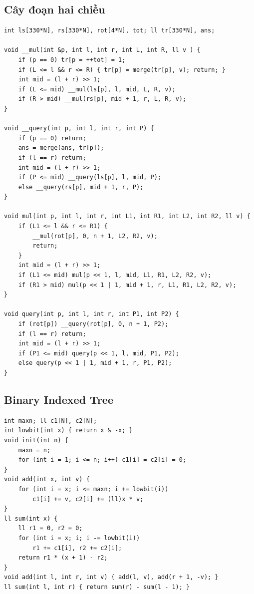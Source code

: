 \documentclass[11pt]{article}
\begin{document}
\subsection{Cây đoạn hai chiều}

\begingroup
\footnotesize
\begin{verbatim}
int ls[330*N], rs[330*N], rot[4*N], tot; ll tr[330*N], ans;

void __mul(int &p, int l, int r, int L, int R, ll v ) {
    if (p == 0) tr[p = ++tot] = 1;
    if (L <= l && r <= R) { tr[p] = merge(tr[p], v); return; }
    int mid = (l + r) >> 1;
    if (L <= mid) __mul(ls[p], l, mid, L, R, v);
    if (R > mid) __mul(rs[p], mid + 1, r, L, R, v);
}

void __query(int p, int l, int r, int P) {
    if (p == 0) return;
    ans = merge(ans, tr[p]);
    if (l == r) return;
    int mid = (l + r) >> 1;
    if (P <= mid) __query(ls[p], l, mid, P);
    else __query(rs[p], mid + 1, r, P);
}

void mul(int p, int l, int r, int L1, int R1, int L2, int R2, ll v) {
    if (L1 <= l && r <= R1) {
        __mul(rot[p], 0, n + 1, L2, R2, v);
        return;
    }
    int mid = (l + r) >> 1;
    if (L1 <= mid) mul(p << 1, l, mid, L1, R1, L2, R2, v);
    if (R1 > mid) mul(p << 1 | 1, mid + 1, r, L1, R1, L2, R2, v);
}

void query(int p, int l, int r, int P1, int P2) {
    if (rot[p]) __query(rot[p], 0, n + 1, P2);
    if (l == r) return;
    int mid = (l + r) >> 1;
    if (P1 <= mid) query(p << 1, l, mid, P1, P2);
    else query(p << 1 | 1, mid + 1, r, P1, P2);
}
\end{verbatim}
\endgroup

\subsection{Binary Indexed Tree}

\begingroup
\footnotesize
\begin{verbatim}
int maxn; ll c1[N], c2[N];
int lowbit(int x) { return x & -x; }
void init(int n) {
    maxn = n;
    for (int i = 1; i <= n; i++) c1[i] = c2[i] = 0;
}
void add(int x, int v) {
    for (int i = x; i <= maxn; i += lowbit(i))
        c1[i] += v, c2[i] += (ll)x * v;
}
ll sum(int x) {
    ll r1 = 0, r2 = 0;
    for (int i = x; i; i -= lowbit(i))
        r1 += c1[i], r2 += c2[i];
    return r1 * (x + 1) - r2;
}
void add(int l, int r, int v) { add(l, v), add(r + 1, -v); }
ll sum(int l, int r) { return sum(r) - sum(l - 1); }
\end{verbatim}
\endgroup
\end{document}
